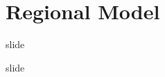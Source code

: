 \documentclass[
presentation.tex
]{subfiles}
\begin{document}
\section{Regional Model}


\begin{frame}{slide}
	
	slide
	
\end{frame}
\end{document}
